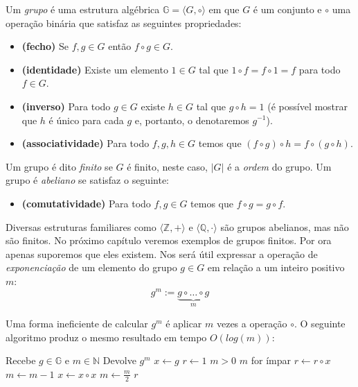 Um {\em grupo} é uma estrutura algébrica $\mathbb{G} = \langle G, \circ \rangle$ em que $G$ é um conjunto e $\circ$ uma operação binária que satisfaz as seguintes propriedades:
\begin{itemize}
\item[] {\bf (fecho)} Se $f, g \in G$ então $f \circ g \in G$.
\item[] {\bf (identidade)} Existe um elemento $1 \in G$ tal que $1 \circ f = f \circ 1 = f$ para todo $f \in G$.
\item[] {\bf (inverso)} Para todo $g \in G$ existe $h \in G$ tal que $g \circ h = 1$ (é possível mostrar que $h$ é único para cada $g$ e, portanto, o denotaremos $g^{-1}$).
\item[] {\bf (associatividade)} Para todo $f,g,h \in G$ temos que $(f \circ g) \circ h = f \circ (g \circ h)$. 
\end{itemize}

Um grupo é dito {\em finito} se $G$ é finito, neste caso, $|G|$ é a {\em ordem} do grupo.
Um grupo é {\em abeliano} se satisfaz o seguinte:
\begin{itemize}
\item[] {\bf (comutatividade)} Para todo $f, g \in G$ temos que $f \circ g = g \circ f$.
\end{itemize}
 
Diversas estruturas familiares como $\langle \mathbb{Z}, + \rangle$ e $\langle \mathbb{Q}, \cdot \rangle$ são grupos abelianos, mas não são finitos.
No próximo capítulo veremos exemplos de grupos finitos.
Por ora apenas suporemos que eles existem.
Nos será útil expressar a operação de {\em exponenciação} de um elemento do grupo $g \in G$ em relação a um inteiro positivo $m$:
\begin{displaymath}
  g^m := \underbrace{g \circ \dots \circ g}_m
\end{displaymath}

Uma forma ineficiente de calcular $g^m$ é aplicar $m$ vezes a operação $\circ$.
O seguinte algoritmo produz o mesmo resultado em tempo $O(log(m))$:


\begin{codebox}
\li \Comment Recebe $g \in \mathbb{G}$ e $m \in \mathbb{N}$
\li \Comment Devolve $g^m$
\li $x \gets g$
\li $r \gets 1$
\li \While $m > 0$
\li \Do \If $m$ for ímpar 
\li \Then $r \gets r \circ x$
\li $m \gets m - 1$
\End
\li $x \gets x \circ x$
\li $m \gets \frac{m}{2}$
\End
\li \Return $r$
\End
\end{codebox}

